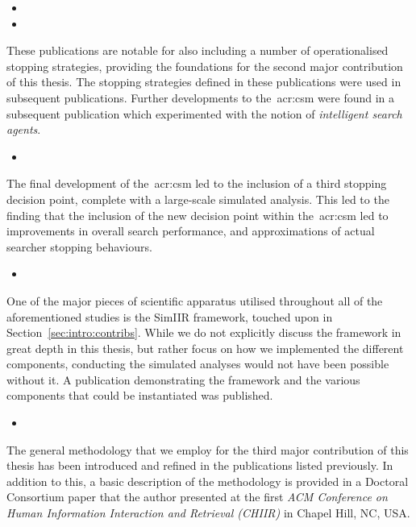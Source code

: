 \begin{itemize}
    \item{}
    \item{}
\end{itemize}

These publications are notable for also including a number of operationalised stopping strategies, providing the foundations for the second major contribution of this thesis. The stopping strategies defined in these publications were used in subsequent publications. Further developments to the~\gls{acr:csm} were found in a subsequent publication which experimented with the notion of \emph{intelligent search agents}.

\begin{itemize}
    \item{}
\end{itemize}

The final development of the~\gls{acr:csm} led to the inclusion of a third stopping decision point, complete with a large-scale simulated analysis. This led to the finding that the inclusion of the new decision point within the~\gls{acr:csm} led to improvements in overall search performance, and approximations of actual searcher stopping behaviours.

\begin{itemize}
    \item{}
\end{itemize}

\noindent
{}
One of the major pieces of scientific apparatus utilised throughout all of the aforementioned studies is the SimIIR framework, touched upon in Section~\ref{sec:intro:contribs}. While we do not explicitly discuss the framework in great depth in this thesis, but rather focus on how we implemented the different components, conducting the simulated analyses would not have been possible without it. A publication demonstrating the framework and the various components that could be instantiated was published.

\begin{itemize}
    \item{}
\end{itemize}

\noindent
{}
The general methodology that we employ for the third major contribution of this thesis has been introduced and refined in the publications listed previously. In addition to this, a basic description of the methodology is provided in a Doctoral Consortium paper that the author presented at the first \emph{ACM Conference on Human Information Interaction and Retrieval (CHIIR)} in Chapel Hill, NC, USA.

